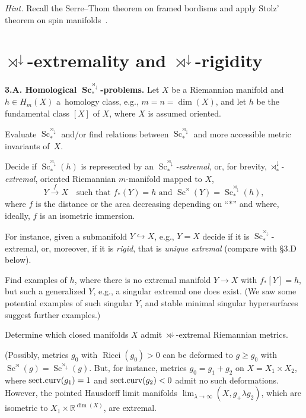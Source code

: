 \documentclass[10pt,a4paper]{amsart}
\numberwithin{equation}{section}
\begin{document}
 {\it Hint.} Recall the Serre--Thom theorem on framed bordisms
 and apply Stolz' theorem on spin manifolds~\cite{St1992}.

\section[rtimes\^{}\{downarrow\}-extremality and rtimes\^{}\{downarrow\}-rigidity]{$\boldsymbol{\rtimes^\downarrow}$-extremality and $\boldsymbol{\rtimes^\downarrow}$-rigidity}\label{section3}

\textbf{3.A. Homological $\boldsymbol{\operatorname{Sc}_\ast^{\rtimes_\downarrow}}$-problems.} Let $X$ be a Riemannian manifold and $h\in H_m(X)$ a~homology class,
e.g., $m=n=\dim(X)$, and let $h$ be the fundamental class $[X]$ of $X$, where $X$ is assumed oriented.

Evaluate $\operatorname{Sc}_\ast^{\rtimes_\downarrow}$ and/or
find relations between $\operatorname{Sc}_\ast^{\rtimes_\downarrow}$
 and more accessible metric invariants of~$X$.

Decide if $\operatorname{Sc}_\ast^{\rtimes_\downarrow}(h)$ is represented
by an {\it $\operatorname{Sc}_\ast^{\rtimes_\downarrow}$-extremal}, or, for brevity, {\it $\rtimes^\downarrow_\ast$-extremal},
oriented Riemannian $m$-manifold mapped to $X$,
\[
Y\overset {f} \rightarrow X \quad \text{such that $f_\ast(Y)=h$ and $\operatorname{Sc}^\rtimes (Y)= \operatorname{Sc}_\ast^{\rtimes_\downarrow}(h)$},
\]
where $f$ is the distance or the area decreasing depending on ``$\ast$'' and where, ideally, $f$ is an isometric immersion.

For instance, given a submanifold $Y\hookrightarrow X$, e.g., $Y=X$ decide if it is $\operatorname{Sc}_\ast^{\rtimes_\downarrow}$-extremal,
or, moreover, if it is {\it rigid}, that is {\it unique extremal} (compare with \S3.D below).

Find examples of $h$, where there is no extremal manifold $Y\to X$ with $f_\ast[Y]=h$, but such a generalized $Y$, e.g., a singular extremal one does exist. (We saw some potential examples of such singular $Y$, and stable minimal singular hypersurfaces suggest further examples.)

Determine which closed manifolds $X$ admit
$\rtimes^\downarrow$-extremal Riemannian metrics.

(Possibly, metrics $g_0$ with $\operatorname{Ricci}(g_0) >0$ can be deformed to $g\geq g_0$ with
$\operatorname{Sc}^{\rtimes}(g)= \operatorname{Sc}^{\rtimes_\downarrow}(g)$.
But, for instance, metrics $g_0=g_1+g_2$ on $X = X_1\times X_2 $,
 where ${\rm sect.curv}(g_1)=1$ and ${\rm sect.curv}(g_2)< 0$ admit no such deformations. However, the pointed Hausdorff limit manifolds $\lim_{\lambda\to \infty}(X,g_+\lambda g_2)$, which are isometric to $X_1\times \mathbb R^{\dim(X)}$,
 are extremal.
\end{document}
